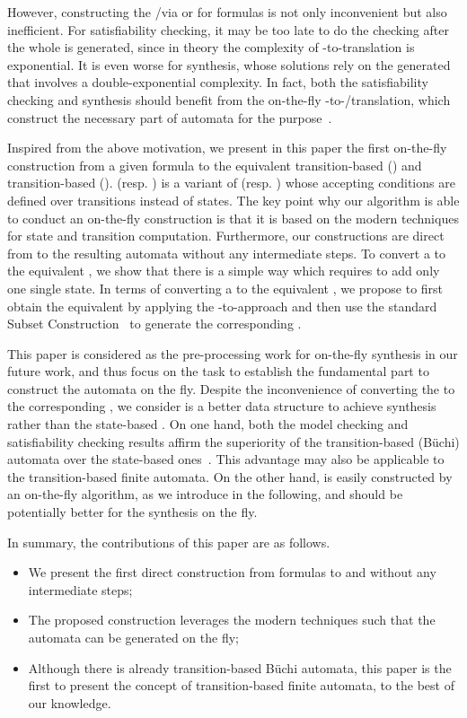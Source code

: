 However, constructing the \NFA/\DFA via \spot or \mona for \ltlf formulas is not only inconvenient but also inefficient. For \ltlf satisfiability checking, it may be too late to do the checking after the whole \NFA is generated, since in theory the complexity of \ltlf-to-\NFA translation is exponential. It is even worse for \ltlf synthesis, whose solutions rely on the generated \DFA that involves a double-exponential complexity. In fact, both the \ltlf satisfiability checking and \ltlf synthesis should benefit from the on-the-fly \ltlf-to-\NFA/\DFA translation, which construct the necessary part of automata for the purpose~\cite{GPVW95}.  

Inspired from the above motivation, we present in this paper the first on-the-fly construction from a given \ltlf formula to the equivalent transition-based \NFA (\TNFA) and transition-based \DFA (\TDFA). \TNFA (resp. \TDFA) is a variant of \NFA (resp. \DFA) whose accepting conditions are defined over transitions instead of states. The key point why our algorithm is able to conduct an on-the-fly construction is that it is based on the modern \SAT techniques for state and transition computation. Furthermore, our constructions are direct from \ltlf to the resulting automata without any intermediate steps. To convert a \TNFA to the equivalent \NFA, we show that there is a simple way which requires to add only one single state. In terms of converting a \TDFA to the equivalent \DFA, we propose to first obtain the equivalent \NFA by applying the \TNFA-to-\NFA approach and then use the standard Subset Construction~\cite{RS59} to generate the corresponding \DFA.   

This paper is considered as the pre-processing work for \ltlf on-the-fly synthesis in our future work, and thus focus on the task to establish the fundamental part to construct the automata on the fly. Despite the inconvenience of converting the \TDFA to the corresponding \DFA, we consider \TDFA is a better data structure to achieve \ltlf synthesis rather than the state-based \DFA. On one hand, both the \ltl model checking and \ltl satisfiability checking results affirm the superiority of the transition-based (B\"uchi) automata over the state-based ones~\cite{GL02}. This advantage may also be applicable to the transition-based finite automata. On the other hand, \TDFA is easily constructed by an on-the-fly algorithm, as we introduce in the following, and should be potentially better for the synthesis on the fly. 

In summary, the contributions of this paper are as follows.
\begin{itemize}
	\item We present the first direct construction from \ltlf formulas to \TNFA and \TDFA without any intermediate steps;
	\item The proposed construction leverages the modern \SAT techniques such that the automata can be generated on the fly;
	\item Although there is already transition-based B\"uchi automata, this paper is the first to present the concept of transition-based finite automata, to the best of our knowledge.
\end{itemize}

